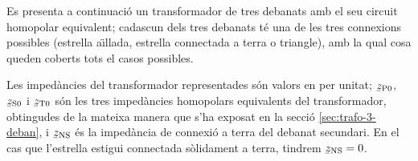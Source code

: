 Es presenta a continuaci\'{o} un transformador de tres debanats amb el seu circuit homopolar equivalent; cadascun dels tres debanats t\'{e} una de les tres connexions possibles (estrella a\"{\i}llada, estrella connectada a terra o triangle), amb la qual cosa queden coberts tots el casos possibles.

Les imped\`{a}ncies del transformador representades s\'{o}n valors en per unitat; $\cmplx{z}\ped{P0}$, $\cmplx{z}\ped{S0}$ i $\cmplx{z}\ped{T0}$ s\'{o}n les tres imped\`{a}ncies homopolars equivalents del transformador, obtingudes de la mateixa manera que s'ha exposat en la secci\'{o} \ref{sec:trafo-3-deban}, i $\cmplx{z}\ped{NS}$ \'{e}s  la imped\`{a}ncia de connexi\'{o} a terra del debanat secundari. En el cas que l'estrella estigui connectada s\`{o}lidament a terra, tindrem $\cmplx{z}\ped{NS}=0$.

\begin{center}
    
\end{center}
